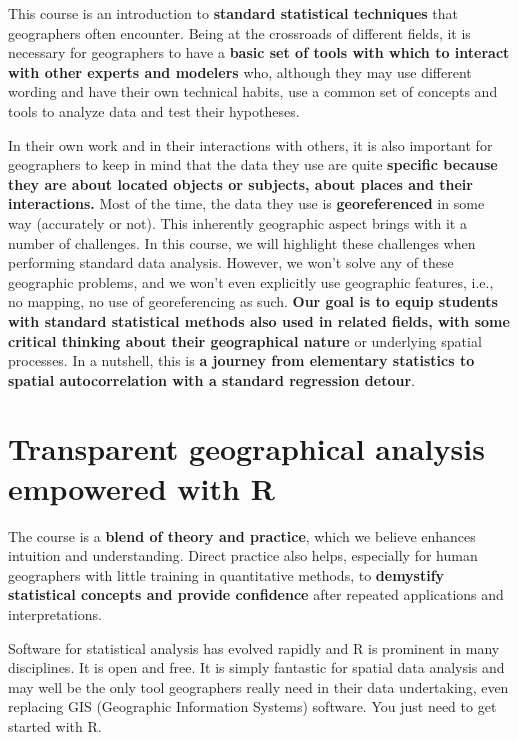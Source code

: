 \documentclass[
  letterpaper,
  DIV=11,
  numbers=noendperiod]{scrreprt}
\begin{document}
This course is an introduction to \textbf{standard statistical
techniques} that geographers often encounter. Being at the crossroads of
different fields, it is necessary for geographers to have a
\textbf{basic set of tools with which to interact with other experts and
modelers} who, although they may use different wording and have their
own technical habits, use a common set of concepts and tools to analyze
data and test their hypotheses.

In their own work and in their interactions with others, it is also
important for geographers to keep in mind that the data they use are
quite \textbf{specific because they are about located objects or
subjects, about places and their interactions.} Most of the time, the
data they use is \textbf{georeferenced} in some way (accurately or not).
This inherently geographic aspect brings with it a number of challenges.
In this course, we will highlight these challenges when performing
standard data analysis. However, we won't solve any of these geographic
problems, and we won't even explicitly use geographic features, i.e., no
mapping, no use of georeferencing as such. \textbf{Our goal is to equip
students with standard statistical methods also used in related fields,
with some critical thinking about their geographical nature} or
underlying spatial processes. In a nutshell, this is \textbf{a journey
from elementary statistics to spatial autocorrelation with a standard
regression detour}.

\section{Transparent geographical analysis empowered with
R}\label{sec-transparent-geographical-analysis-empowered-with-r}

The course is a \textbf{blend of theory and practice}, which we believe
enhances intuition and understanding. Direct practice also helps,
especially for human geographers with little training in quantitative
methods, to \textbf{demystify statistical concepts and provide
confidence} after repeated applications and interpretations.

Software for statistical analysis has evolved rapidly and R is prominent
in many disciplines. It is open and free. It is simply fantastic for
spatial data analysis and may well be the only tool geographers really
need in their data undertaking, even replacing GIS (Geographic
Information Systems) software. You just need to get started with R.
\end{document}
